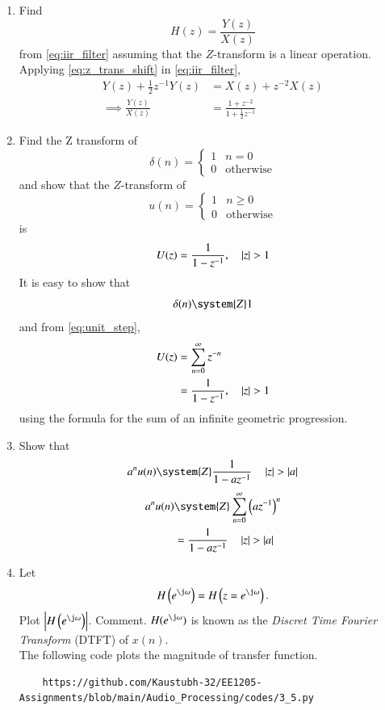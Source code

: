 \documentclass[journal,12pt,twocolumn]{IEEEtran}
\theoremstyle{remark}
\begin{document}
\begin{enumerate}[label=\thesection.\arabic*]
\item Find
%
\begin{equation}
H(z) = \frac{Y(z)}{X(z)}
\end{equation}
%
from  \eqref{eq:iir_filter} assuming that the $Z$-transform is a linear operation.
\\
\solution  Applying \eqref{eq:z_trans_shift} in \eqref{eq:iir_filter},
\begin{align}
Y(z) + \frac{1}{2}z^{-1}Y(z) &= X(z)+z^{-2}X(z)
\\
\implies \frac{Y(z)}{X(z)} &= \frac{1 + z^{-2}}{1 + \frac{1}{2}z^{-1}}
\label{eq:freq_resp}
\end{align}
%
\item Find the Z transform of 
\begin{equation}
\delta(n)
=
\begin{cases}
1 & n = 0
\\
0 & \text{otherwise}
\end{cases}
\end{equation}
and show that the $Z$-transform of
\begin{equation}
\label{eq:unit_step}
u(n)
=
\begin{cases}
1 & n \ge 0
\\
0 & \text{otherwise}
\end{cases}
\end{equation}
is
\begin{equation}
U(z) = \frac{1}{1-z^{-1}}, \quad \left\vert z\right\vert > 1
\end{equation}
\solution It is easy to show that
\begin{equation}
\delta(n) \system{Z} 1
\end{equation}
and from \eqref{eq:unit_step},
\begin{align}
U(z) &= \sum _{n= 0}^{\infty}z^{-n}
\\
&=\frac{1}{1-z^{-1}}, \quad \left\vert z\right\vert > 1
\end{align}
using the formula for the sum of an infinite geometric progression.
%
\item Show that 
\begin{equation}
\label{eq:anun}
a^nu(n) \system{Z} \frac{1}{1-az^{-1}} \quad \abs{z} > \abs{a}
\end{equation}
\solution 
\begin{align}
	a^nu(n) &\system{Z} \sum_{n = 0}^{\infty}\brak{az^{-1}}^n \\
			&= \frac{1}{1-az^{-1}} \quad \abs{z} > \abs{a}
\end{align}
%
\item 
Let
\begin{equation}
H\brak{e^{\j \omega}} = H\brak{z = e^{\j \omega}}.
\end{equation}
Plot $\abs{H\brak{e^{\j \omega}}}$.  Comment.  $H(e^{\j \omega})$ is
known as the {\em Discret Time Fourier Transform} (DTFT) of $x(n)$.
\\
\solution The following code plots the magnitude of transfer function.
\begin{lstlisting}
    https://github.com/Kaustubh-32/EE1205-Assignments/blob/main/Audio_Processing/codes/3_5.py
\end{lstlisting}


\end{enumerate}
\end{document}
